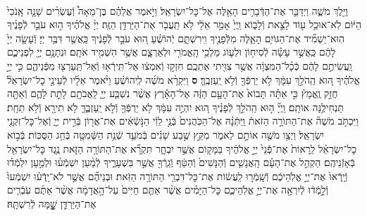 \documentclass[twoside, openany, parskip=half, 11pt]{book}
\begin{document}
\begin{sometimes}
\begin{footnotesize}
\begin{multicols}{2}
\\
וַיֵּ֖לֶךְ מֹשֶׁ֑ה וַיְדַבֵּ֛ר אֶת־הַדְּֿבָרִ֥ים הָאֵ֖לֶּה אֶל־כׇּל־יִשְׂרָאֵֽל׃ וַיֹּ֣אמֶר אֲלֵהֶ֗ם בֶּן־מֵאָה֩ וְֿעֶשְׂרִ֨ים שָׁנָ֤ה אָֽנֹכִי֙ הַיּ֔וֹם לֹֽא־אוּכַ֥ל ע֖וֹד לָצֵ֣את וְֿלָב֑וֹא וַֽיְיָ֙ אָמַ֣ר אֵלַ֔י לֹ֥א תַֽעֲבֹ֖ר אֶת־הַיַּרְדֵּ֥ן הַזֶּֽה׃ יְיָ֨ אֱלֹהֶ֜יךָ ה֣וּא עֹבֵ֣ר לְֿפָנֶ֗יךָ הֽוּא־יַשְׁמִ֞יד אֶת־הַגּוֹיִ֥ם הָאֵ֛לֶּה מִלְּֿפָנֶ֖יךָ וִֽירִשְׁתָּ֑ם יְֿהוֹשֻׁ֗עַ ה֚וּא עֹבֵ֣ר לְֿפָנֶ֔יךָ כַּֽאֲשֶׁ֖ר דִּבֶּ֥ר יְיָ׃
וְֿעָשָׂ֤ה יְיָ֙ לָהֶ֔ם כַּֽאֲשֶׁ֣ר עָשָׂ֗ה לְֿסִיח֥וֹן וּלְע֛וֹג מַלְכֵ֥י הָֽאֱמֹרִ֖י וּלְאַרְצָ֑ם אֲשֶׁ֥ר הִשְׁמִ֖יד אֹתָֽם׃ וּנְתָנָ֥ם יְיָ֖ לִפְנֵיכֶ֑ם וַֽעֲשִׂיתֶ֣ם לָהֶ֔ם כְּֿכָ֨ל־הַמִּצְוָ֔ה אֲשֶׁ֥ר צִוִּ֖יתִי אֶתְכֶֽם׃ חִזְק֣וּ וְֿאִמְצ֔וּ אַל־תִּֽירְֿא֥וּ וְֿאַל־תַּֽעַרְצ֖וּ מִפְּֿנֵיהֶ֑ם כִּ֣י יְיָ֣ אֱלֹהֶ֗יךָ ה֚וּא הַֽהֹלֵ֣ךְ עִמָּ֔ךְ לֹ֥א יַרְפְּֿךָ֖ וְֿלֹ֥א יַֽעַזְבֶֽךָּ׃ \textbf{ס}
וַיִּקְרָ֨א מֹשֶׁ֜ה לִֽיהוֹשֻׁ֗עַ וַיֹּ֨אמֶר אֵלָ֜יו לְֿעֵינֵ֣י כׇל־יִשְׂרָאֵל֘ חֲזַ֣ק וֶֽאֱמָץ֒ כִּ֣י אַתָּ֗ה תָּבוֹא֙ אֶת־הָעָ֣ם הַזֶּ֔ה אֶל־הָאָ֕רֶץ אֲשֶׁ֨ר נִשְׁבַּ֧ע יְיָ֛ לַֽאֲבֹתָ֖ם לָתֵ֣ת לָהֶ֑ם וְֿאַתָּ֖ה תַּנְחִילֶ֥נָּה אוֹתָֽם׃ וַֽיְיָ֞ ה֣וּא הַֽהֹלֵ֣ךְ לְֿפָנֶ֗יךָ ה֚וּא יִהְיֶ֣ה עִמָּ֔ךְ לֹ֥א יַרְפְּֿךָ֖ וְֿלֹ֣א יַֽעַזְבֶ֑ךָּ לֹ֥א תִירָ֖א וְֿלֹ֥א תֵחָֽת׃ וַיִּכְתֹּ֣ב מֹשֶׁה֘ אֶת־הַתּוֹרָ֣ה הַזֹּאת֒ וַֽיִּתְּֿנָ֗הּ אֶל־הַכֹּֽהֲנִים֙ בְּֿנֵ֣י לֵוִ֔י הַנֹּ֣שְֿׂאִ֔ים אֶת־אֲר֖וֹן בְּֿרִ֣ית יְיָ֑ וְֿאֶל־כׇּל־זִקְנֵ֖י יִשְׂרָאֵֽל׃ וַיְצַ֥ו מֹשֶׁ֖ה אוֹתָ֣ם לֵאמֹ֑ר מִקֵּ֣ץ שֶׁ֣בַע שָׁנִ֗ים בְּֿמֹעֵ֛ד שְֿׁנַ֥ת הַשְּֿׁמִטָּ֖ה בְּֿחַ֥ג הַסֻּכּֽוֹת׃ בְּֿב֣וֹא כׇל־יִשְׂרָאֵ֗ל לֵֽרָאוֹת֙ אֶת־פְּֿֿנֵי֙ יְיָ֣ אֱלֹהֶ֔יךָ בַּמָּק֖וֹם אֲשֶׁ֣ר יִבְחָ֑ר תִּקְרָ֞א אֶת־הַתּוֹרָ֥ה הַזֹּ֛את נֶ֥גֶד כׇּל־יִשְׂרָאֵ֖ל בְּֿאָזְֿנֵיהֶֽם׃ הַקְהֵ֣ל אֶת־הָעָ֗ם הָֽאֲנָשִׁ֤ים וְֿהַנָּשִׁים֙ וְֿהַטַּ֔ף וְֿגֵֽרְֿךָ֖ אֲשֶׁ֣ר בִּשְׁעָרֶ֑יךָ לְֿמַ֨עַן יִשְׁמְֿע֜וּ וּלְמַ֣עַן יִלְמְֿד֗וּ וְֿיָֽרְֿאוּ֙ אֶת־יְיָ֣ אֱלֹֽהֵיכֶ֔ם וְֿשָֽׁמְֿר֣וּ לַֽעֲשׂ֔וֹת אֶת־כׇּל־דִּבְרֵ֖י הַתּוֹרָ֥ה הַזֹּֽאת׃ וּבְנֵיהֶ֞ם אֲשֶׁ֣ר לֹא־יָֽדְֿע֗וּ יִשְׁמְֿעוּ֙ וְֿלָ֣מְֿד֔וּ לְֿיִרְאָ֖ה אֶת־יְיָ֣ אֱלֹֽהֵיכֶ֑ם כׇּל־הַיָּמִ֗ים אֲשֶׁ֨ר אַתֶּ֤ם חַיִּים֙ עַל־הָ֣אֲדָמָ֔ה אֲשֶׁ֨ר אַתֶּ֜ם עֹֽבְֿרִ֧ים אֶת־הַיַּרְדֵּ֛ן שׇׇׇׇׇׇָׁ֖מָּה לְֿרִשְׁתָּֽהּ׃


\end{multicols}
\end{footnotesize}
\end{sometimes}
\end{document}
